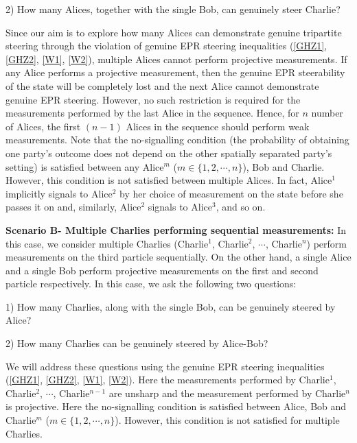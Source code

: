 \documentclass[pra,a4paper,aps,twocolumn,showpacs,superscriptaddress,groupedaddress]{revtex4}
\begin{document}
2) How many Alices, together with the single Bob, can genuinely steer Charlie?

Since our aim is to explore how many Alices can demonstrate genuine tripartite  steering through the violation of genuine EPR steering inequalities (\ref{GHZ1}, \ref{GHZ2}, \ref{W1}, \ref{W2}), multiple Alices cannot perform projective measurements. If any Alice performs a projective measurement, then the genuine EPR steerability of the state will be completely lost and the next Alice cannot demonstrate genuine EPR steering. However, no such restriction is required for the measurements performed by the last Alice in the sequence. Hence, for $n$ number of Alices, the first $(n - 1)$ Alices in the sequence should perform weak measurements.  Note that the no-signalling condition (the probability of obtaining one party's outcome does not depend on the other spatially separated party's setting) is satisfied between any Alice$^m$ ($m \in \{1, 2, \cdots, n \}$), Bob and Charlie. However, this condition is not satisfied between multiple Alices. In fact, Alice$^1$  implicitly signals to Alice$^2$  by her  choice of measurement on the state before she  passes it on and, similarly, Alice$^2$ signals to Alice$^3$, and so on.

{\bf Scenario B- Multiple Charlies performing sequential measurements:} In this case, we consider multiple Charlies (Charlie$^1$, Charlie$^2$, $\cdots$, Charlie$^n$) perform measurements on the third particle sequentially. On the other hand, a single Alice and a single Bob perform projective measurements on the first and second particle respectively.  In this case, we ask the following two questions:

1) How many Charlies, along with the single Bob, can be  genuinely steered by Alice?

2) How many Charlies  can be  genuinely steered by Alice-Bob?

We will address these questions using the genuine EPR steering inequalities (\ref{GHZ1}, \ref{GHZ2}, \ref{W1}, \ref{W2}). Here the measurements performed by Charlie$^1$, Charlie$^2$, $\cdots$, Charlie$^{n-1}$ are unsharp and the measurement performed by Charlie$^n$ is projective.  Here the no-signalling condition  is satisfied between Alice, Bob and Charlie$^m$ ($m \in \{1, 2, \cdots, n \}$). However, this condition is not satisfied for multiple Charlies.
\end{document}
